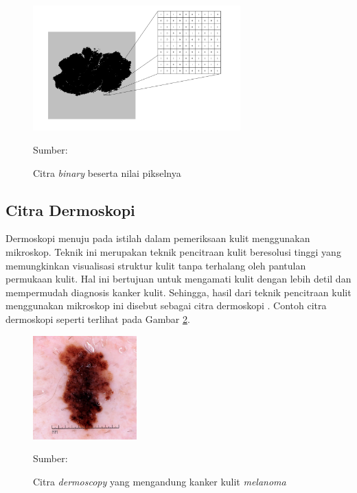    \begin{figure}[H]
        \begin{center}
            \includegraphics[width=8cm]{img/bab2/biner.png}
            \caption{Citra \textit{binary} beserta nilai pikselnya}
            \label{fig:binary}
            Sumber: \citep{Kusumanto2011}
        \end{center}
    \end{figure}

    \subsection{Citra Dermoskopi}
    Dermoskopi menuju pada istilah dalam pemeriksaan kulit menggunakan mikroskop. Teknik ini merupakan teknik pencitraan kulit beresolusi tinggi yang memungkinkan visualisasi struktur kulit tanpa terhalang oleh pantulan permukaan kulit. Hal ini bertujuan untuk mengamati kulit dengan lebih detil dan mempermudah diagnosis kanker kulit. Sehingga, hasil dari teknik pencitraan kulit menggunakan mikroskop ini disebut sebagai citra dermoskopi \citep{Celebi2019}. Contoh citra dermoskopi seperti terlihat pada Gambar \ref{fig:dermoscopy}.

    \begin{figure}[H]
        \begin{center}
            \includegraphics[width=4cm]{img/bab2/dermoscopy.jpg}
            \caption{Citra \textit{dermoscopy} yang mengandung kanker kulit \textit{melanoma}}
            \label{fig:dermoscopy}
            Sumber: \citep{Nersisson2021a}
        \end{center}
    \end{figure}

